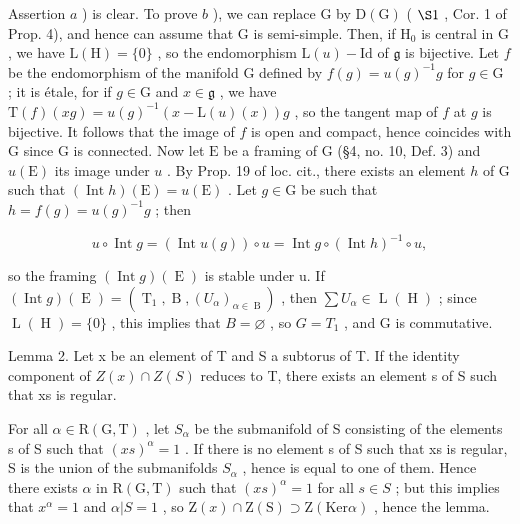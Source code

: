 Assertion \(a\) ) is clear. To prove \(b\) ), we can replace \(\mathrm{G}\) by \(\mathrm{D}(\mathrm{G})\) ( \(\S 1\) , Cor. 1 of Prop. 4), and hence can assume that \(\mathrm{G}\) is semi-simple. Then, if \(\mathrm{H}_0\) is central in \(\mathrm{G}\) , we have \(\mathrm{L}(\mathrm{H}) = \{0\}\) , so the endomorphism \(\mathrm{L}(u) - \mathrm{Id}\) of \(\mathfrak{g}\) is bijective. Let \(f\) be the endomorphism of the manifold \(\mathrm{G}\) defined by \(f(g) = u(g)^{-1}g\) for \(g \in \mathrm{G}\) ; it is étale, for if \(g \in \mathrm{G}\) and \(x \in \mathfrak{g}\) , we have \(\mathrm{T}(f)(xg) = u(g)^{-1}(x - \mathrm{L}(u)(x))g\) , so the tangent map of \(f\) at \(g\) is bijective. It follows that the image of \(f\) is open and compact, hence coincides with \(\mathrm{G}\) since \(\mathrm{G}\) is connected. Now let \(\mathrm{E}\) be a framing of G (§4, no. 10, Def. 3) and \(u(\mathrm{E})\) its image under \(u\) . By Prop. 19 of loc. cit., there exists an element \(h\) of G such that \((\operatorname{Int} h)(\mathrm{E}) = u(\mathrm{E})\) . Let \(g \in \mathrm{G}\) be such that \(h = f(g) = u(g)^{-1}g\) ; then

\[
u \circ \operatorname{Int} g = (\operatorname{Int} u (g)) \circ u = \operatorname{Int} g \circ (\operatorname{Int} h) ^ {- 1} \circ u,
\]

so the framing \((\operatorname{Int} g)(\operatorname{E})\) is stable under u. If \((\operatorname{Int} g)(\operatorname{E}) = (\operatorname{T}_{1}, \operatorname{B}, (U_{\alpha})_{\alpha \in \operatorname{B}})\) , then \(\sum U_{\alpha} \in \operatorname{L}(\operatorname{H})\) ; since \(\operatorname{L}(\operatorname{H}) = \{0\}\) , this implies that \(B = \varnothing\) , so \(G = T_{1}\) , and G is commutative.

Lemma 2. Let x be an element of T and S a subtorus of T. If the identity component of \(Z(x) \cap Z(S)\) reduces to T, there exists an element s of S such that xs is regular.

For all \(\alpha\in\mathrm{R}(\mathrm{G},\mathrm{T})\) , let \(S_{\alpha}\) be the submanifold of S consisting of the elements s of S such that \((xs)^{\alpha}=1\) . If there is no element s of S such that xs is regular, S is the union of the submanifolds \(S_{\alpha}\) , hence is equal to one of them. Hence there exists \(\alpha\) in \(\mathrm{R}(\mathrm{G},\mathrm{T})\) such that \((xs)^{\alpha}=1\) for all \(s\in S\) ; but this implies that \(x^{\alpha}=1\) and \(\alpha|S=1\) , so \(\mathrm{Z}(x)\cap\mathrm{Z}(\mathrm{S})\supset\mathrm{Z}(\mathrm{Ker}\alpha)\) , hence the lemma.


